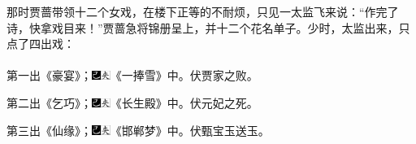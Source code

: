 那时贾蔷带领十二个女戏，在楼下正等的不耐烦，只见一太监飞来说：“作完了诗，快拿戏目来！”贾蔷急将锦册呈上，并十二个花名单子。少时，太监出来，只点了四出戏：
\\
\\
\indent
第一出《豪宴》；{\includegraphics[width=3mm]{../Images/00003}\includegraphics[width=3mm]{../Images/00012}\footnotesize \kaishu 《一捧雪》中。伏贾家之败。}

第二出《乞巧》；{\includegraphics[width=3mm]{../Images/00003}\includegraphics[width=3mm]{../Images/00012}\footnotesize \kaishu 《长生殿》中。伏元妃之死。}

第三出《仙缘》；{\includegraphics[width=3mm]{../Images/00003}\includegraphics[width=3mm]{../Images/00012}\footnotesize \kaishu 《邯郸梦》中。伏甄宝玉送玉。}

